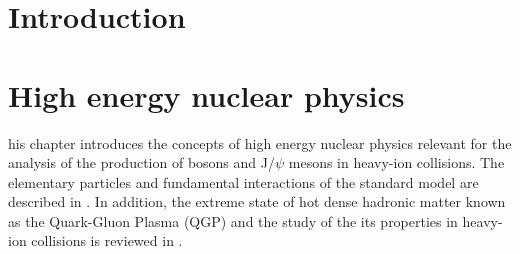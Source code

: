 \let\textcircled=\pgftextcircled
\chapter*{Introduction} \label{sec:Introduction}


\clearpage

\chapter{High energy nuclear physics} \label{sec:Introduction}


his chapter introduces the concepts of high energy nuclear physics relevant for the analysis of the production of {\PW} bosons and J/$\psi$ mesons in heavy-ion collisions. The elementary particles and fundamental interactions of the standard model are described in . In addition, the extreme state of hot dense hadronic matter known as the Quark-Gluon Plasma (QGP) and the study of the its properties in heavy-ion collisions is reviewed in .



\clearpage
